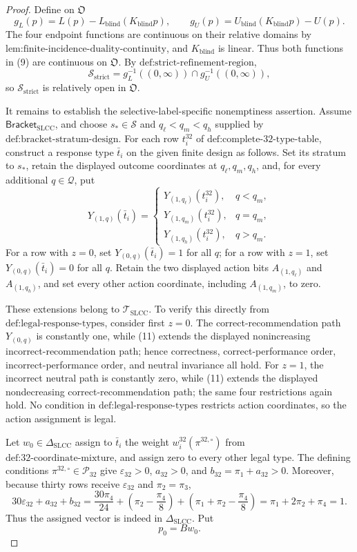 \documentclass{article}
\begin{document}
\begin{proof}
Define on \(\mathfrak O\)
\[
 g_L(p)=L(p)-L_{\mathrm{blind}}(K_{\mathrm{blind}}p),
 \qquad
 g_U(p)=U_{\mathrm{blind}}(K_{\mathrm{blind}}p)-U(p).
\tag{9}
\]
The four endpoint functions are continuous on their relative domains by \(\text{lem:finite-incidence-duality-continuity}\), and \(K_{\mathrm{blind}}\) is linear.  Thus both functions in (9) are continuous on \(\mathfrak O\).  By \(\text{def:strict-refinement-region}\),
\[
 \mathcal S_{\mathrm{strict}}
 =g_L^{-1}((0,\infty))\cap g_U^{-1}((0,\infty)),
\tag{10}
\]
so \(\mathcal S_{\mathrm{strict}}\) is relatively open in \(\mathfrak O\).

It remains to establish the selective-label-specific nonemptiness assertion.  Assume \(\mathsf{Bracket}_{\mathrm{SLCC}}\), and choose \(s_*\in\mathcal S\) and \(q_\ell<q_m<q_h\) supplied by \(\text{def:bracket-stratum-design}\).  For each row \(t_i^{32}\) of \(\text{def:complete-32-type-table}\), construct a response type \(\bar t_i\) on the given finite design as follows.  Set its stratum to \(s_*\), retain the displayed outcome coordinates at \(q_\ell,q_m,q_h\), and, for every additional \(q\in\mathcal Q\), put
\[
 Y_{(1,q)}(\bar t_i)=
 \begin{cases}
 Y_{(1,q_\ell)}(t_i^{32}),&q<q_m,\\
 Y_{(1,q_m)}(t_i^{32}),&q=q_m,\\
 Y_{(1,q_h)}(t_i^{32}),&q>q_m.
 \end{cases}
\tag{11}
\]
For a row with \(z=0\), set \(Y_{(0,q)}(\bar t_i)=1\) for all \(q\); for a row with \(z=1\), set \(Y_{(0,q)}(\bar t_i)=0\) for all \(q\).  Retain the two displayed action bits \(A_{(1,q_\ell)}\) and \(A_{(1,q_h)}\), and set every other action coordinate, including \(A_{(1,q_m)}\), to zero.

These extensions belong to \(\mathcal T_{\mathrm{SLCC}}\).  To verify this directly from \(\text{def:legal-response-types}\), consider first \(z=0\).  The correct-recommendation path \(Y_{(0,q)}\) is constantly one, while (11) extends the displayed nonincreasing incorrect-recommendation path; hence correctness, correct-performance order, incorrect-performance order, and neutral invariance all hold.  For \(z=1\), the incorrect neutral path is constantly zero, while (11) extends the displayed nondecreasing correct-recommendation path; the same four restrictions again hold.  No condition in \(\text{def:legal-response-types}\) restricts action coordinates, so the action assignment is legal.

Let \(w_0\in\Delta_{\mathrm{SLCC}}\) assign to \(\bar t_i\) the weight \(w_i^{32}(\pi^{32,\circ})\) from \(\text{def:32-coordinate-mixture}\), and assign zero to every other legal type.  The defining conditions \(\pi^{32,\circ}\in\mathcal P_{32}\) give \(\varepsilon_{32}>0\), \(a_{32}>0\), and \(b_{32}=\pi_1+a_{32}>0\).  Moreover, because thirty rows receive \(\varepsilon_{32}\) and \(\pi_2=\pi_3\),
\[
 30\varepsilon_{32}+a_{32}+b_{32}
 =\frac{30\pi_4}{24}+\left(\pi_2-\frac{\pi_4}{8}\right)
  +\left(\pi_1+\pi_2-\frac{\pi_4}{8}\right)
 =\pi_1+2\pi_2+\pi_4=1.
\tag{12}
\]
Thus the assigned vector is indeed in \(\Delta_{\mathrm{SLCC}}\).  Put
\[
 p_0=Bw_0.
\tag{13}
\]


\end{proof}
\end{document}

